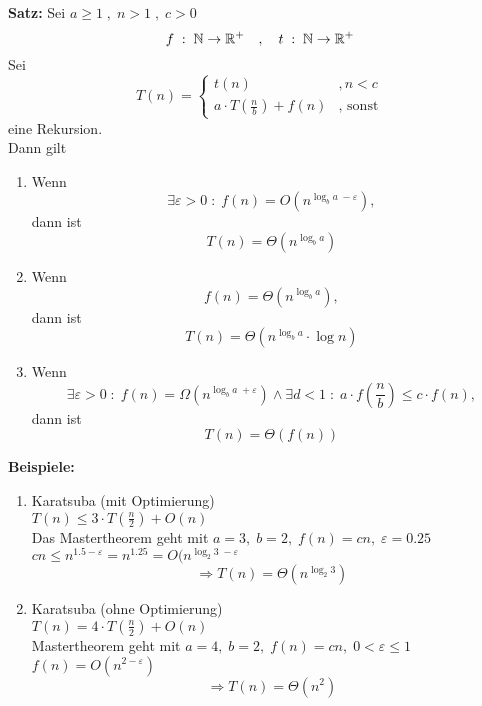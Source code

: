 \begin{description}

\item{\bfseries Satz:} Sei $a \geq 1 \; , \; n > 1 \; , \; c>0$\\
$$
f \; : \; \mathbb{N} \rightarrow \mathbb{R}^+ \quad , \quad t \; : \; \mathbb{N} \rightarrow \mathbb{R}^+
$$
Sei
$$
T(n) = \left\{
\begin{array}{lr}
t(n) & , n < c\\
a \cdot T(\frac{n}{b}) + f(n) & \text{, sonst}
\end{array}
\right.
$$
eine Rekursion.\\
Dann gilt

\begin{enumerate}[\bfseries (i)]

\item Wenn
$$
\exists \varepsilon > 0 \; : \; f(n) = O\left( n^{\log_b a \; - \varepsilon} \right),
$$
dann ist
$$
T(n) = \Theta \left( n^{\log_b a} \right)
$$

\item Wenn
$$
f(n) = \Theta \left( n^{\log_b a} \right),
$$
dann ist
$$
T(n) = \Theta \left( n^{\log_b a} \cdot \log n \right)
$$

\item Wenn
$$
\exists \varepsilon > 0 \; : \; f(n) = \Omega \left( n^{\log_b a \; + \varepsilon} \right) \land \exists d < 1 \; : \; a\cdot f\left( \frac{n}{b} \right) \leq c \cdot f(n),
$$
dann ist
$$
T(n) = \Theta \left( f(n) \right)
$$

\end{enumerate}

\item{\bfseries Beispiele:}

\begin{enumerate}[\bfseries (1)]

\item Karatsuba (mit Optimierung)\\
$T(n) \leq 3 \cdot T( \frac{n}{2} ) + O(n)$\\
Das Mastertheorem geht mit $a = 3, \; b=2,\; f(n) = cn,\; \varepsilon  = 0.25$\\
$cn \leq n^{1.5 - \varepsilon} = n^{1.25} = O(n^{\log_2 3 \; - \varepsilon}$
$$
\Rightarrow T(n) = \Theta \left( n^{\log_2 3} \right)
$$

\item Karatsuba (ohne Optimierung)\\
$T(n) = 4 \cdot T(\frac{n}{2} ) + O(n)$\\
Mastertheorem geht mit $a=4, \; b=2, \; f(n) = cn, \; 0 < \varepsilon \leq 1$\\
$f(n) = O(n^{2 - \varepsilon})$
$$
\Rightarrow T(n) = \Theta (n^2)
$$


\end{enumerate}
\end{description}
